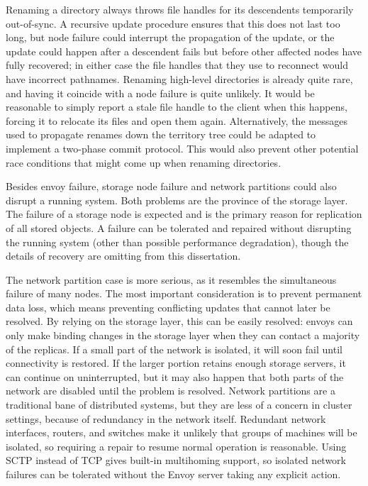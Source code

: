Renaming a directory always throws file handles for its descendents temporarily out-of-sync. A recursive update procedure ensures that this does not last too long, but node failure could interrupt the propagation of the update, or the update could happen after a descendent fails but before other affected nodes have fully recovered; in either case the file handles that they use to reconnect would have incorrect pathnames. Renaming high-level directories is already quite rare, and having it coincide with a node failure is quite unlikely. It would be reasonable to simply report a stale file handle to the client when this happens, forcing it to relocate its files and open them again. Alternatively, the messages used to propagate renames down the territory tree could be adapted to implement a two-phase commit protocol. This would also prevent other potential race conditions that might come up when renaming directories.

Besides envoy failure, storage node failure and network partitions could also disrupt a running system. Both problems are the province of the storage layer. The failure of a storage node is expected and is the primary reason for replication of all stored objects. A failure can be tolerated and repaired without disrupting the running system (other than possible performance degradation), though the details of recovery are omitting from this dissertation.

The network partition case is more serious, as it resembles the simultaneous failure of many nodes. The most important consideration is to prevent permanent data loss, which means preventing conflicting updates that cannot later be resolved. By relying on the storage layer, this can be easily resolved: envoys can only make binding changes in the storage layer when they can contact a majority of the replicas. If a small part of the network is isolated, it will soon fail until connectivity is restored. If the larger portion retains enough storage servers, it can continue on uninterrupted, but it may also happen that both parts of the network are disabled until the problem is resolved. Network partitions are a traditional bane of distributed systems, but they are less of a concern in cluster settings, because of redundancy in the network itself. Redundant network interfaces, routers, and switches make it unlikely that groups of machines will be isolated, so requiring a repair to resume normal operation is reasonable. Using SCTP \cite{stewart} instead of TCP gives built-in multihoming support, so isolated network failures can be tolerated without the Envoy server taking any explicit action.

